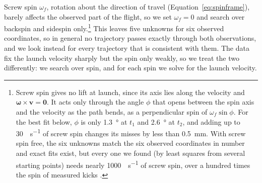 \documentclass[10pt,a4paper]{article}
\begin{document}
\label{sec:screw}
Screw spin $\omega_f$, rotation about the direction of travel
(Equation~\ref{eq:spinframe}), barely affects the observed part of the
flight, so we set $\omega_f = 0$ and search over backspin and sidespin only.\footnote{Screw spin
gives no lift at launch, since its axis lies along the velocity and
$\bm{\omega}\times\bm{v} = \bm{0}$. It acts only through the angle $\phi$ that
opens between the spin axis and the velocity as the path bends, as a
perpendicular spin of $\omega_f \sin\phi$. For the best fit below, $\phi$ is
only \SI{1.3}{\degree} at $t_1$ and \SI{2.6}{\degree} at $t_2$, and adding up
to \SI{30}{\rev\per\second} of screw spin changes its misses by less than
\SI{0.5}{\milli\metre}. With screw spin free, the six unknowns match the six
observed coordinates in number and exact fits exist, but every one we found
(by least squares from several starting points) needs nearly
\SI{1000}{\rev\per\second} of screw spin, over a hundred times the spin of
measured kicks \citep{tsukada2011, whiteside2010}.}
This leaves five unknowns for six observed coordinates, so in general no
trajectory passes exactly through both observations, and we look instead for
every trajectory that is consistent with them.
The data fix the launch velocity sharply but the spin only weakly, so we
treat the two differently: we search over spin, and for each spin we solve
for the launch velocity.
\end{document}
